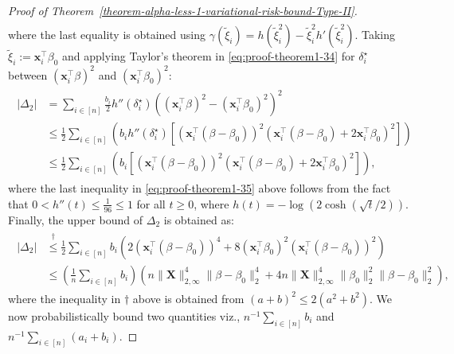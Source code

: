 \documentclass[12pt]{article}
\numberwithin{equation}{section}
\begin{document}
\begin{proof}[Proof of Theorem~\ref{theorem-alpha-less-1-variational-risk-bound-Type-II}]
\begin{equation}
\begin{split}
    \end{split}
\end{equation}
where the last equality is obtained using $\gamma(\tilde{\xi}_i) = h(\tilde{\xi}_i^2) - \tilde{\xi}_i^2h'(\tilde{\xi}_i^2)$. Taking $\tilde{\xi}_i := \mathbf{x}_i^{\top}\beta_0$ and applying Taylor's theorem in \eqref{eq:proof-theorem1-34} for $\delta_i^{\star}$ between $(\mathbf{x}_i^{\top}\beta)^2$ and $(\mathbf{x}_i^{\top}\beta_0)^2$:
\begin{align}\label{eq:proof-theorem1-35}
    \begin{split}
        |\Delta_2| &= \sum_{i\in [n]}\frac{b_i}{2}h''(\delta_i^{\star})\left((\mathbf{x}_i^{\top}\beta)^2 - (\mathbf{x}_i^{\top}\beta_0)^2\right)^2\\
        &\leq \frac{1}{2}\sum_{i\in [n]}\left(b_i h''(\delta_i^{\star})\left[\left(\mathbf{x}_i^{\top}(\beta-\beta_0)\right)^2\left(\mathbf{x}_i^{\top}(\beta-\beta_0) + 2\mathbf{x}_i^{\top}\beta_0\right)^2\right]\right)\\
        &\leq \frac{1}{2}\sum_{i\in [n]}\left(b_i\left[\left(\mathbf{x}_i^{\top}(\beta-\beta_0)\right)^2\left(\mathbf{x}_i^{\top}(\beta-\beta_0) + 2\mathbf{x}_i^{\top}\beta_0\right)^2\right]\right),
    \end{split}
\end{align}
where the last inequality in \eqref{eq:proof-theorem1-35} above follows from the fact that $0<h''(t)\leq \frac{1}{96} \leq 1$ for all $t\geq 0$, where $h(t) = -\log (2\cosh(\sqrt{t}/2))$. Finally, the upper bound of $\Delta_2$ is obtained as:
\begin{align}\label{eq:proof-theorem1-36}
    \begin{split}
        |\Delta_2| &\stackrel{\dagger}{\leq} \frac{1}{2}\sum_{i\in [n]}b_i\left(2\left(\mathbf{x}_i^{\top}(\beta-\beta_0)\right)^4 + 8(\mathbf{x}_i^{\top}\beta_0)^2\left(\mathbf{x}_i^{\top}(\beta-\beta_0)\right)^2\right)\\
        &\leq\left(\frac{1}{n}\sum_{i\in [n]}b_i\right)\left(n\lVert \mathbf{X}\rVert_{2, \infty}^{4}\lVert \beta-\beta_0\rVert_{2}^{4} + 4n\lVert \mathbf{X}\rVert_{2, \infty}^{4}\lVert \beta_0\rVert_{2}^{2}\lVert \beta-\beta_0\rVert_{2}^{2}\right),
    \end{split}
\end{align}
where the inequality in $\dagger$ above is obtained from $(a+b)^2\leq 2(a^2+b^2)$. We now probabilistically bound two quantities viz., $n^{-1}\sum_{i\in [n]}b_i$ and $n^{-1}\sum_{i\in [n]}(a_i+b_i)$.


\end{proof}
\end{document}
